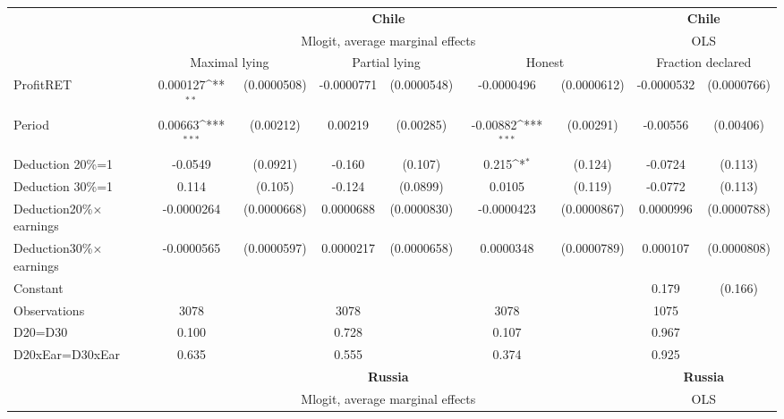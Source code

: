 \def\sym#1{\ifmmode^{#1}\else\(^{#1}\)\fi}
\begin{tabular}{l|cccccc|cc}
\hline\hline
&\multicolumn{6}{c|}{\bf Chile}&\multicolumn{2}{c}{\bf Chile}\\ &\multicolumn{6}{c|}{Mlogit, average marginal effects }&\multicolumn{2}{c}{OLS}\\
                &\multicolumn{2}{c}{Maximal lying}&\multicolumn{2}{c}{Partial lying}&\multicolumn{2}{c}{Honest}  &\multicolumn{2}{c}{Fraction declared}\\
\hline
ProfitRET       & 0.000127\sym{**} &(0.0000508)&-0.0000771         &(0.0000548)&-0.0000496         &(0.0000612)&-0.0000532         &(0.0000766)\\
Period          &  0.00663\sym{***}&(0.00212)&  0.00219         &(0.00285)& -0.00882\sym{***}&(0.00291)& -0.00556         &(0.00406)\\
Deduction 20\%=1&  -0.0549         & (0.0921)&   -0.160         &  (0.107)&    0.215\sym{*}  &  (0.124)&  -0.0724         &  (0.113)\\
Deduction 30\%=1&    0.114         &  (0.105)&   -0.124         & (0.0899)&   0.0105         &  (0.119)&  -0.0772         &  (0.113)\\
Deduction\space{}20\%$\times$\space{}earnings&-0.0000264         &(0.0000668)&0.0000688         &(0.0000830)&-0.0000423         &(0.0000867)&0.0000996         &(0.0000788)\\
Deduction\space{}30\%$\times$\space{}earnings&-0.0000565         &(0.0000597)&0.0000217         &(0.0000658)&0.0000348         &(0.0000789)& 0.000107         &(0.0000808)\\
Constant        &                  &         &                  &         &                  &         &    0.179         &  (0.166)\\
\hline
Observations    &     3078         &         &     3078         &         &     3078         &         &     1075         &         \\
D20=D30         &    0.100         &         &    0.728         &         &    0.107         &         &    0.967         &         \\
D20xEar=D30xEar &    0.635         &         &    0.555         &         &    0.374         &         &    0.925         &         \\
\hline\hline
&\multicolumn{6}{c|}{\bf Russia}&\multicolumn{2}{c}{\bf Russia}\\ &\multicolumn{6}{c|}{Mlogit, average marginal effects }&\multicolumn{2}{c}{OLS}\\

\end{tabular}
